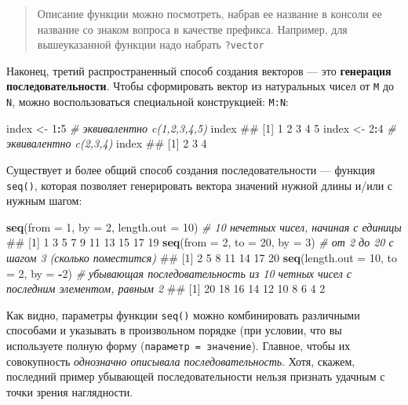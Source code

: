 \documentclass[]{book}
\newenvironment{Shaded}{\begin{snugshade}}{\end{snugshade}}
\newcommand{\KeywordTok}[1]{\textcolor[rgb]{0.13,0.29,0.53}{\textbf{#1}}}
\newcommand{\DataTypeTok}[1]{\textcolor[rgb]{0.13,0.29,0.53}{#1}}
\newcommand{\DecValTok}[1]{\textcolor[rgb]{0.00,0.00,0.81}{#1}}
\newcommand{\StringTok}[1]{\textcolor[rgb]{0.31,0.60,0.02}{#1}}
\newcommand{\CommentTok}[1]{\textcolor[rgb]{0.56,0.35,0.01}{\textit{#1}}}
\newcommand{\OperatorTok}[1]{\textcolor[rgb]{0.81,0.36,0.00}{\textbf{#1}}}
\newcommand{\NormalTok}[1]{#1}
\begin{document}
\begin{quote}
Описание функции можно посмотреть, набрав ее название в консоли ее
название со знаком вопроса в качестве префикса. Например, для
вышеуказанной функции надо набрать \texttt{?vector}
\end{quote}

Наконец, третий распространенный способ создания векторов --- это
\textbf{генерация последовательности}. Чтобы сформировать вектор из
натуральных чисел от \texttt{M} до \texttt{N}, можно воспользоваться
специальной конструкцией: \texttt{M:N}:

\begin{Shaded}
\begin{Highlighting}[]
\NormalTok{index <-}\StringTok{ }\DecValTok{1}\OperatorTok{:}\DecValTok{5} \CommentTok{# эквивалентно c(1,2,3,4,5)}
\NormalTok{index}
\NormalTok{## [1] 1 2 3 4 5}
\NormalTok{index <-}\StringTok{ }\DecValTok{2}\OperatorTok{:}\DecValTok{4} \CommentTok{# эквивалентно c(2,3,4)}
\NormalTok{index}
\NormalTok{## [1] 2 3 4}
\end{Highlighting}
\end{Shaded}

Существует и более общий способ создания последовательности --- функция
\texttt{seq()}, которая позволяет генерировать вектора значений нужной
длины и/или с нужным шагом:

\begin{Shaded}
\begin{Highlighting}[]
\KeywordTok{seq}\NormalTok{(}\DataTypeTok{from =} \DecValTok{1}\NormalTok{, }\DataTypeTok{by =} \DecValTok{2}\NormalTok{, }\DataTypeTok{length.out =} \DecValTok{10}\NormalTok{) }\CommentTok{# 10 нечетных чисел, начиная с единицы}
\NormalTok{##  [1]  1  3  5  7  9 11 13 15 17 19}
\KeywordTok{seq}\NormalTok{(}\DataTypeTok{from =} \DecValTok{2}\NormalTok{, }\DataTypeTok{to =} \DecValTok{20}\NormalTok{, }\DataTypeTok{by =} \DecValTok{3}\NormalTok{) }\CommentTok{# от 2 до 20 с шагом 3 (сколько поместится)}
\NormalTok{## [1]  2  5  8 11 14 17 20}
\KeywordTok{seq}\NormalTok{(}\DataTypeTok{length.out =} \DecValTok{10}\NormalTok{, }\DataTypeTok{to =} \DecValTok{2}\NormalTok{, }\DataTypeTok{by =} \OperatorTok{-}\DecValTok{2}\NormalTok{) }\CommentTok{# убывающая последовательность из 10 четных чисел с последним элементом, равным 2}
\NormalTok{##  [1] 20 18 16 14 12 10  8  6  4  2}
\end{Highlighting}
\end{Shaded}

Как видно, параметры функции \texttt{seq()} можно комбинировать
различными способами и указывать в произвольном порядке (при условии,
что вы используете полную форму (\texttt{параметр\ =\ значение}).
Главное, чтобы их совокупность \emph{однозначно описывала
последовательность}. Хотя, скажем, последний пример убывающей
последовательности нельзя признать удачным с точки зрения наглядности.
\end{document}
